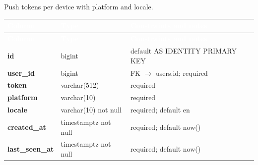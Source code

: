 \subsection*{}
Push tokens per device with platform and locale.\par\vspace{2pt}
{\tabfont\rowband
\begin{longtable}{@{}>{\raggedright\arraybackslash}p{}>{\raggedright\arraybackslash}p{}>{\raggedright\arraybackslash}p{}@{}}
\rowcolor{najdanavy}\textcolor{white}{\sffamily\bfseries\small Column} & \textcolor{white}{\sffamily\bfseries\small Type} & \textcolor{white}{\sffamily\bfseries\small Constraints and notes}\\
\endfirsthead
\rowcolor{najdanavy}\textcolor{white}{\sffamily\bfseries\small Column} & \textcolor{white}{\sffamily\bfseries\small Type} & \textcolor{white}{\sffamily\bfseries\small Constraints and notes}\\
\endhead
\bottomrule\endlastfoot
\textbf{id} & bigint & default AS IDENTITY PRIMARY KEY\\
\textbf{user\_\allowbreak{}id} & bigint & FK $\rightarrow$ users.id; required\\
\textbf{token} & varchar(512) & required\\
\textbf{platform} & varchar(10) & required\\
\textbf{locale} & varchar(10) not null & required; default en\\
\textbf{created\_\allowbreak{}at} & timestamptz not null & required; default now()\\
\textbf{last\_\allowbreak{}seen\_\allowbreak{}at} & timestamptz not null & required; default now()\\
\end{longtable}}
